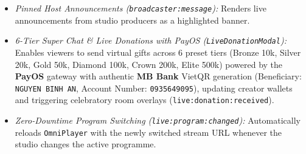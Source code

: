 {\begin{enumerate}[leftmargin=*,itemsep=2pt]
\begin{itemize}[leftmargin=*,itemsep=1pt]
    \item \emph{Pinned Host Announcements (\texttt{broadcaster:message}):} Renders live announcements from studio producers as a highlighted banner.
    \item \emph{6-Tier Super Chat \& Live Donations with PayOS (\texttt{LiveDonationModal}):} Enables viewers to send virtual gifts across 6 preset tiers (Bronze 10k, Silver 20k, Gold 50k, Diamond 100k, Crown 200k, Elite 500k) powered by the \textbf{PayOS} gateway with authentic \textbf{MB Bank} VietQR generation (Beneficiary: \texttt{NGUYEN BINH AN}, Account Number: \texttt{0935649095}), updating creator wallets and triggering celebratory room overlays (\texttt{live:donation:received}).
    \item \emph{Zero-Downtime Program Switching (\texttt{live:program:changed}):} Automatically reloads \texttt{OmniPlayer} with the newly switched stream URL whenever the studio changes the active programme.
  \end{itemize}
\end{enumerate}
}

\subsection{}

